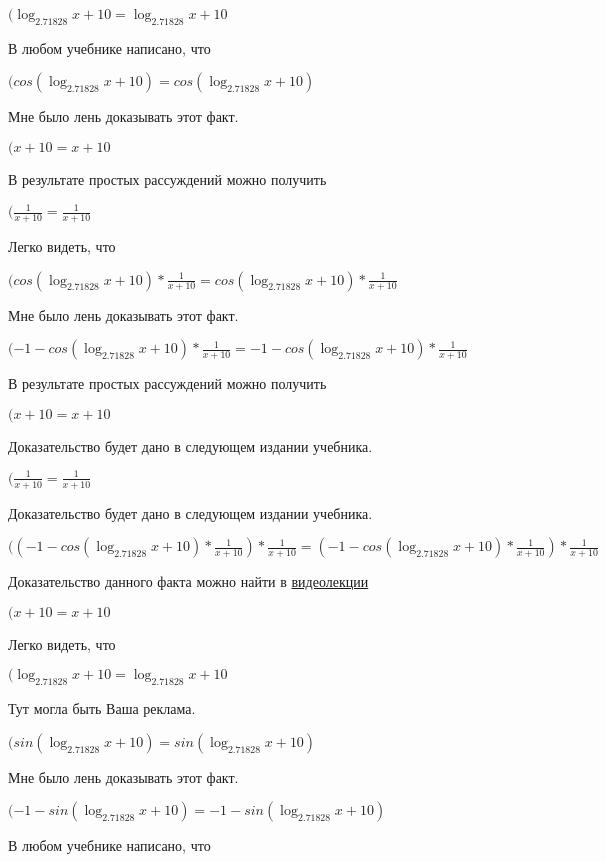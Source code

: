 \documentclass[12pt,a4paper,fleqn]{article}
\theoremstyle{definition}
\begin{document}
$(\log_{ 2.71828 }{ x  +  10 } = \log_{ 2.71828 }{ x  +  10 }$

В любом учебнике написано, что

$(cos(\log_{ 2.71828 }{ x  +  10 }) = cos(\log_{ 2.71828 }{ x  +  10 })$

Мне было лень доказывать этот факт.

$( x  +  10  =  x  +  10 $

В результате простых рассуждений можно получить

$(\frac{ 1 }{ x  +  10 }
 = \frac{ 1 }{ x  +  10 }
$

Легко видеть, что

$(cos(\log_{ 2.71828 }{ x  +  10 }) * \frac{ 1 }{ x  +  10 }
 = cos(\log_{ 2.71828 }{ x  +  10 }) * \frac{ 1 }{ x  +  10 }
$

Мне было лень доказывать этот факт.

$( -1  - cos(\log_{ 2.71828 }{ x  +  10 }) * \frac{ 1 }{ x  +  10 }
 =  -1  - cos(\log_{ 2.71828 }{ x  +  10 }) * \frac{ 1 }{ x  +  10 }
$

В результате простых рассуждений можно получить

$( x  +  10  =  x  +  10 $

Доказательство будет дано в следующем издании учебника.

$(\frac{ 1 }{ x  +  10 }
 = \frac{ 1 }{ x  +  10 }
$

Доказательство будет дано в следующем издании учебника.

$(( -1  - cos(\log_{ 2.71828 }{ x  +  10 }) * \frac{ 1 }{ x  +  10 }
) * \frac{ 1 }{ x  +  10 }
 = ( -1  - cos(\log_{ 2.71828 }{ x  +  10 }) * \frac{ 1 }{ x  +  10 }
) * \frac{ 1 }{ x  +  10 }
$

Доказательство данного факта можно найти в \href{https://www.youtube.com/watch?v=dQw4w9WgXcQ}{видеолекции}

$( x  +  10  =  x  +  10 $

Легко видеть, что

$(\log_{ 2.71828 }{ x  +  10 } = \log_{ 2.71828 }{ x  +  10 }$

Тут могла быть Ваша реклама.

$(sin(\log_{ 2.71828 }{ x  +  10 }) = sin(\log_{ 2.71828 }{ x  +  10 })$

Мне было лень доказывать этот факт.

$( -1  - sin(\log_{ 2.71828 }{ x  +  10 }) =  -1  - sin(\log_{ 2.71828 }{ x  +  10 })$

В любом учебнике написано, что
\end{document}
